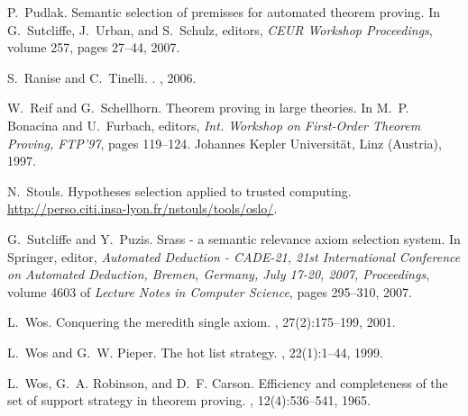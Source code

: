 \documentclass{acm_proc_article-sp}
\theoremstyle{nonumberplain}
\begin{document}
\begin{thebibliography}{10}
P.~Pudlak.
\newblock Semantic selection of premisses for automated theorem proving.
\newblock In G.~Sutcliffe, J.~Urban, and S.~Schulz, editors, {\em CEUR Workshop
  Proceedings}, volume 257, pages 27--44, 2007.

S.~Ranise and C.~Tinelli.
.
, 2006.

W.~Reif and G.~Schellhorn.
\newblock Theorem proving in large theories.
\newblock In M.~P. Bonacina and U.~Furbach, editors, {\em Int. Workshop on
  First-Order Theorem Proving, {FTP}'97}, pages 119--124. Johannes Kepler
  Universit{\"a}t, Linz (Austria), 1997.

N.~Stouls.
\newblock Hypotheses selection applied to trusted computing.
\newblock \url{http://perso.citi.insa-lyon.fr/nstouls/tools/oslo/}.

G.~Sutcliffe and Y.~Puzis.
\newblock Srass - a semantic relevance axiom selection system.
\newblock In Springer, editor, {\em Automated Deduction - CADE-21, 21st
  International Conference on Automated Deduction, Bremen, Germany, July 17-20,
  2007, Proceedings}, volume 4603 of {\em Lecture Notes in Computer Science},
  pages 295--310, 2007.

L.~Wos.
\newblock Conquering the meredith single axiom.
, 27(2):175--199, 2001.

L.~Wos and G.~W. Pieper.
\newblock The hot list strategy.
, 22(1):1--44, 1999.

L.~Wos, G.~A. Robinson, and D.~F. Carson.
\newblock Efficiency and completeness of the set of support strategy in theorem
  proving.
, 12(4):536--541, 1965.

\end{thebibliography}
\end{document}
